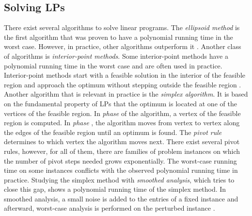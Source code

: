 \subsection{Solving LPs} \label{section:solving_lps}
There exist several algorithms to solve linear programs. The \textit{ellipsoid method} is the first algorithm that was proven to have a polynomial running time in the worst case. However, in practice, other algorithms outperform it \cite{understanding_lp}. 
Another class of algorithms is \textit{interior-point methods}. Some interior-point methods have a polynomial running time in the worst case and are often used in practice. Interior-point methods start with a feasible solution in the interior of the feasible region and approach the optimum without stepping outside the feasible region \cite{understanding_lp}. \\
Another algorithm that is relevant in practice is the \textit{simplex algorithm}. It is based on the fundamental property of LPs that the optimum is located at one of the vertices of the feasible region. %
In \textit{phase } of the algorithm, a vertex of the feasible region is computed. In \textit{phase }, the algorithm moves from vertex to vertex along the edges of the feasible region until an optimum is found. The \textit{pivot rule} determines to which vertex the algorithm moves next. There exist several pivot rules, however, for all of them, there are families of problem instances on which the number of pivot steps needed grows exponentially. The worst-case running time on some instances conflicts with the observed polynomial running time in practice. Studying the simplex method with \textit{smoothed analysis}, which tries to close this gap, shows a polynomial running time of the simplex method. In smoothed analysis, a small noise is added to the entries of a fixed instance and afterward, worst-case analysis is performed on the perturbed instance \cite{huiberts,dadush}.

